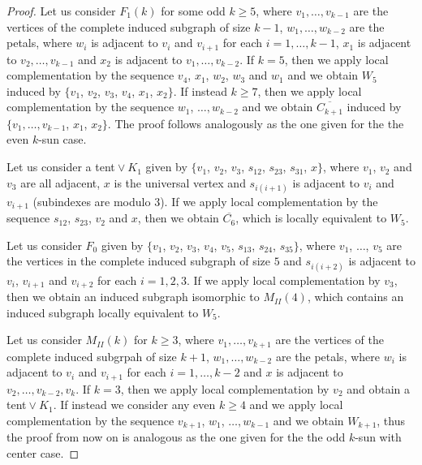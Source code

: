 \documentclass[12pt]{book}
\theoremstyle{plain}
\theoremstyle{remark}
\begin{document}
\begin{proof}

Let us consider $F_{1}(k)$ for some odd $k \geq 5$, where $v_1, \ldots, v_{k-1}$ are the vertices of the complete induced subgraph of size $k-1$, $w_1, \ldots, w_{k-2}$ are the petals, where $w_i$ is adjacent to $v_i$ and $v_{i+1}$ for each $i=1, \ldots, k-1$, $x_1$ is adjacent to $v_2, \ldots, v_{k-1}$ and $x_2$ is adjacent to $v_1, \ldots, v_{k-2}$.
If $k=5$, then we apply local complementation by the sequence $v_4$, $x_1$, $w_2$, $w_3$ and $w_1$ and we obtain $W_5$ induced by $\{ v_1$, $v_2$, $v_3$, $v_4$, $x_1$, $x_2 \}$.
If instead $k \geq 7$, then we apply local complementation by the sequence $w_1$, $\ldots, w_{k-2}$ and we obtain $\overline{C_{k+1}}$ induced by $\{ v_1, \ldots, v_{k-1}$, $x_1$, $x_2 \}$. The proof follows analogously as the one given for the the even $k$-sun case.


Let us consider a tent${}\vee{}K_1$ given by $\{ v_1$, $v_2$, $v_3$, $s_{12}$, $s_{23}$, $s_{31}$, $x\}$, where $v_1$, $v_2$ and $v_3$ are all adjacent, $x$ is the universal vertex and $s_{i(i+1)}$ is adjacent to $v_i$ and $v_{i+1}$ (subindexes are modulo $3$).
If we apply local complementation by the sequence $s_{12}$, $s_{23}$, $v_2$ and $x$, then we obtain $\overline{C_6}$, which is locally equivalent to $W_5$.


Let us consider $F_0$ given by $\{ v_1$, $v_2$, $v_3$, $v_4$, $v_5$, $s_{13}$, $s_{24}$, $s_{35} \}$, where $v_1$, $\ldots$, $v_5$ are the vertices in the complete induced subgraph of size $5$ and $s_{i(i+2)}$ is adjacent to $v_i$, $v_{i+1}$ and $v_{i+2}$ for each $i=1,2,3$.
If we apply local complementation by $v_3$, then we obtain an induced subgraph isomorphic to $M_{II}(4)$, which contains an induced subgraph locally equivalent to $W_5$.



Let us consider $M_{II}(k)$ for $k \geq 3$, where $v_1, \ldots, v_{k+1}$ are the vertices of the complete induced subgrpah of size $k+1$, $w_1, \ldots, w_{k-2}$ are the petals, where $w_i$ is adjacent to $v_i$ and $v_{i+1}$ for each $i=1, \ldots, k-2$ and $x$ is adjacent to $v_2, \ldots, v_{k-2}, v_k$.
If $k=3$, then we apply local complementation by $v_2$ and obtain a tent${}\vee{}K_1$.
If instead we consider any even $k \geq 4$ and we apply local complementation by the sequence $v_{k+1}$, $w_1$, $\ldots, w_{k-1}$ and we obtain $W_{k+1}$, thus the proof from now on is analogous as the one given for the the odd $k$-sun with center case.


\end{proof}
\end{document}
